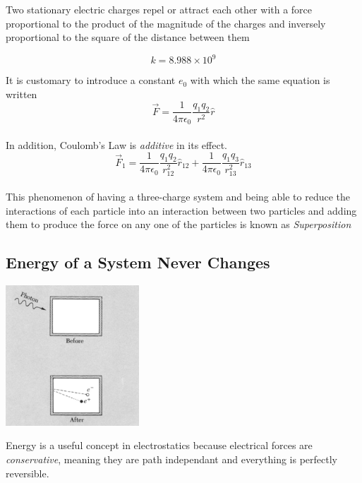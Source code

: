 \documentclass[svgnames]{article}
\begin{document}
Two stationary electric charges repel or attract each other with a force proportional to the product of the magnitude of the charges and inversely proportional to the square of the distance between them

\[ k = 8.988 \times 10^9 \] 
 
It is customary to introduce a constant $e_0$ with which the same equation is written \\ 

\[ \vec{F} = \frac{1}{4\pi \epsilon_0}\frac{q_1q_2}{r^2}\hat{r} \] \\

In addition, Coulomb's Law is \textit{additive} in its effect. \\

\[ \vec{F}_1 = \frac{1}{4\pi \epsilon_0}\frac{q_1q_2}{r_{12}^2}\hat{r}_{12} + \frac{1}{4\pi \epsilon_0}\frac{q_1q_3}{r_{13}^2}\hat{r}_{13} \] \\

This phenomenon of having a three-charge system and being able to reduce the interactions of each particle into an interaction between two particles and adding them to produce the force on any one of the particles is known as \textit{Superposition} 

\subsection{Energy of a System Never Changes}

\vspace{20px}

\begin{center}
\includegraphics[width = 50mm]{ss3.png}
\end{center} 


\vspace{20px}

Energy is a useful concept in electrostatics because electrical forces are \textit{conservative}, meaning they are path independant and everything is perfectly reversible. \\ 
\end{document}
